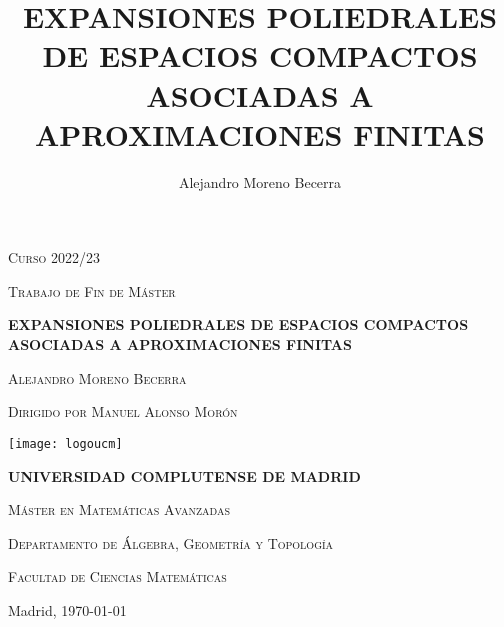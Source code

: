 \documentclass[twoside,reqno, 12pt]{amsbook}
\author{Alejandro Moreno Becerra}
\title{EXPANSIONES POLIEDRALES DE ESPACIOS COMPACTOS ASOCIADAS A APROXIMACIONES FINITAS}
\theoremstyle{definition}
\theoremstyle{definition}
\theoremstyle{definition}
\theoremstyle{definition}
\theoremstyle{definition}
\theoremstyle{definition}
\theoremstyle{definition}
\numberwithin{figure}{chapter}
\begin{document}
\begin{titlepage}

\begin{center}
\textsc{Curso 2022/23}

\vspace*{0.25cm}

\textsc{Trabajo de Fin de Máster}


\vspace*{0.5cm}

{\large \textbf{EXPANSIONES POLIEDRALES DE ESPACIOS COMPACTOS ASOCIADAS A APROXIMACIONES FINITAS}}

\vspace*{0.5cm}

\textsc{Alejandro Moreno Becerra}

\vspace*{0.25cm}

\textsc{Dirigido por Manuel Alonso Morón}


\vspace*{0.8cm}

\texttt{[image: logoucm]}

\vspace*{0.8cm}
{\large \textbf{UNIVERSIDAD COMPLUTENSE DE MADRID}}

\vspace*{0.8cm}
\textsc{Máster en Matemáticas Avanzadas}


\vspace*{0.8cm}
\textsc{Departamento de Álgebra, Geometría y Topología}

\vspace*{0.25cm}
\textsc{Facultad de Ciencias Matemáticas}


\vspace*{6cm}

Madrid, \today

\thispagestyle{empty}

\end{center}
\end{titlepage}
\end{document}

